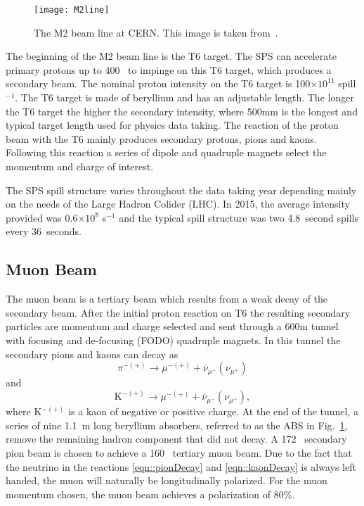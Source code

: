 \begin{figure}[h!t]
  \centering
  \texttt{[image: M2line]}
  \caption{The M2 beam line at CERN.  This image is taken
    from~\cite{ABBON201569}.}
  \label{fig::M2line}
\end{figure}

The beginning of the M2 beam line is the T6 target.  The SPS can accelerate
primary protons up to 400~{\gvc} to impinge on this T6 target, which produces a
secondary beam.  The nominal proton intensity on the T6 target is
100$\times 10^{11}$ spill$^{-1}$.  The T6 target is made of beryllium and has an
adjustable length.  The longer the T6 target the higher the secondary intensity,
where 500mm is the longest and typical target length used for physics data
taking.  The reaction of the proton beam with the T6 mainly produces secondary
protons, pions and kaons.  Following this reaction a series of dipole and
quadruple magnets select the momentum and charge of interest. \par

The SPS spill structure varies throughout the data taking year depending mainly
on the needs of the Large Hadron Colider (LHC).  In 2015, the average intensity
provided was 0.6$\times 10^8$ s$^{-1}$ and the typical spill structure was two
4.8~second spills every 36~seconds.

\subsection{Muon Beam}
The muon beam is a tertiary beam which results from a weak decay of the
secondary beam.  After the initial proton reaction on T6 the resulting secondary
particles are momentum and charge selected and sent through a 600m tunnel with
focusing and de-focusing (FODO) quadruple magnets.  In this tunnel the secondary
pions and kaons can decay as
\begin{equation}
  \pi^{-(+)} \rightarrow \mu^{-(+)} + \overline{\nu}_{\mu^-}(\nu_{\mu^+})
  \label{eqn::pionDecay}
\end{equation}
\noindent
and
\begin{equation}
  \mathrm{K}^{-(+)} \rightarrow \mu^{-(+)} +
  \overline{\nu}_{\mu^-}(\nu_{\mu^+}),
  \label{eqn::kaonDecay}
\end{equation}
\noindent
where K$^{-(+)}$ is a kaon of negative or positive charge.  At the end of the
tunnel, a series of nine 1.1~m long beryllium absorbers, referred to as the ABS
in Fig.~\ref{fig::M2line}, remove the remaining hadron component that did not
decay.  A 172~{\gvc} secondary pion beam is chosen to achieve a 160~{\gvc}
tertiary muon beam.  Due to the fact that the neutrino in the reactions
\ref{eqn::pionDecay} and \ref{eqn::kaonDecay} is always left handed, the muon
will naturally be longitudinally polarized.  For the muon momentum chosen, the
muon beam achieves a polarization of 80\%.

